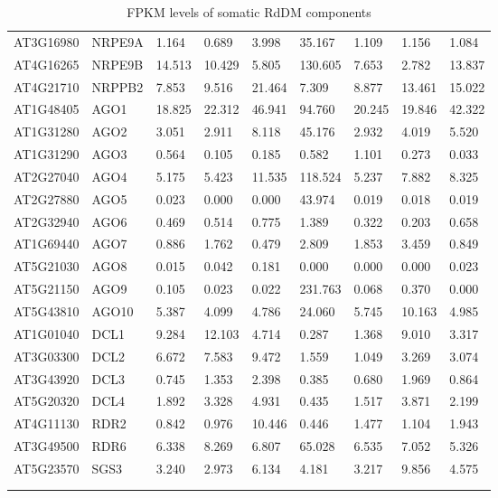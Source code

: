\begin{landscape}
\begin{longtable}{l|l|llll|lll}
AT3G16980 & NRPE9A   & 1.164  & 0.689  & 3.998  & 35.167  & 1.109  & 1.156  & 1.084  \\
AT4G16265 & NRPE9B   & 14.513 & 10.429 & 5.805  & 130.605 & 7.653  & 2.782  & 13.837 \\
AT4G21710 & NRPPB2   & 7.853  & 9.516  & 21.464 & 7.309   & 8.877  & 13.461 & 15.022 \\ \hline
AT1G48405 & AGO1     & 18.825 & 22.312 & 46.941 & 94.760  & 20.245 & 19.846 & 42.322 \\
AT1G31280 & AGO2     & 3.051  & 2.911  & 8.118  & 45.176  & 2.932  & 4.019  & 5.520  \\
AT1G31290 & AGO3     & 0.564  & 0.105  & 0.185  & 0.582   & 1.101  & 0.273  & 0.033  \\
AT2G27040 & AGO4     & 5.175  & 5.423  & 11.535 & 118.524 & 5.237  & 7.882  & 8.325  \\
AT2G27880 & AGO5     & 0.023  & 0.000  & 0.000  & 43.974  & 0.019  & 0.018  & 0.019  \\
AT2G32940 & AGO6     & 0.469  & 0.514  & 0.775  & 1.389   & 0.322  & 0.203  & 0.658  \\
AT1G69440 & AGO7     & 0.886  & 1.762  & 0.479  & 2.809   & 1.853  & 3.459  & 0.849  \\
AT5G21030 & AGO8     & 0.015  & 0.042  & 0.181  & 0.000   & 0.000  & 0.000  & 0.023  \\
AT5G21150 & AGO9     & 0.105  & 0.023  & 0.022  & 231.763 & 0.068  & 0.370  & 0.000  \\
AT5G43810 & AGO10    & 5.387  & 4.099  & 4.786  & 24.060  & 5.745  & 10.163 & 4.985  \\ \hline
AT1G01040 & DCL1     & 9.284  & 12.103 & 4.714  & 0.287   & 1.368  & 9.010  & 3.317  \\
AT3G03300 & DCL2     & 6.672  & 7.583  & 9.472  & 1.559   & 1.049  & 3.269  & 3.074  \\
AT3G43920 & DCL3     & 0.745  & 1.353  & 2.398  & 0.385   & 0.680  & 1.969  & 0.864  \\
AT5G20320 & DCL4     & 1.892  & 3.328  & 4.931  & 0.435   & 1.517  & 3.871  & 2.199  \\ \hline
AT4G11130 & RDR2     & 0.842  & 0.976  & 10.446 & 0.446   & 1.477  & 1.104  & 1.943  \\
AT3G49500 & RDR6     & 6.338  & 8.269  & 6.807  & 65.028  & 6.535  & 7.052  & 5.326  \\ \hline
AT5G23570 & SGS3     & 3.240  & 2.973  & 6.134  & 4.181   & 3.217  & 9.856  & 4.575 \\ 
\caption{FPKM levels of somatic RdDM components} \\
\label{tab:FPKM_soma}\\
\end{longtable}
\end{landscape}

